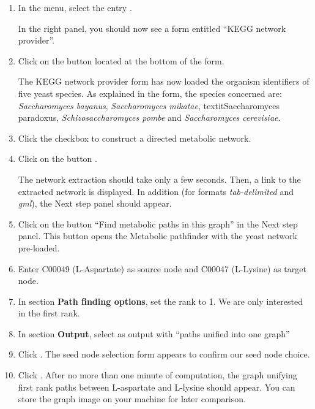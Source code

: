 \begin{enumerate}

\item In the \neat  menu, select the entry .

  In the right panel, you should now see a form entitled
  ``KEGG network provider''.

\item Click on the button  located at the bottom of the form.

  The KEGG network provider form has now loaded the organism identifiers of five yeast species. As explained
  in the form, the species concerned are: \textit{Saccharomyces bayanus}, \textit{Saccharomyces mikatae},
  textit{Saccharomyces paradoxus}, \textit{Schizosaccharomyces pombe} and \textit{Saccharomyces cerevisiae}.

\item Click the checkbox  to construct a directed metabolic network.

\item Click on the button .

  The network extraction should take only a few seconds.
  Then, a link to the extracted network is displayed.
  In addition (for formats \textit{tab-delimited} and \textit{gml}), the Next step panel should appear.

\item Click on the button ``Find metabolic paths in this graph'' in the Next step panel. This button opens the
Metabolic pathfinder with the yeast network pre-loaded.

\item Enter C00049 (L-Aspartate) as source node and C00047 (L-Lysine) as target node.

\item In section \textbf{Path finding options}, set the rank to 1. We are only interested in the first rank.

\item In section \textbf{Output}, select  as output with ``paths unified into one graph''

\item Click .
  The seed node selection form appears to confirm our seed node choice.

\item Click .
	After no more than one minute of computation, the graph unifying first rank paths between L-aspartate and L-lysine should appear.
	You can store the graph image on your machine for later comparison.

\end{enumerate}

